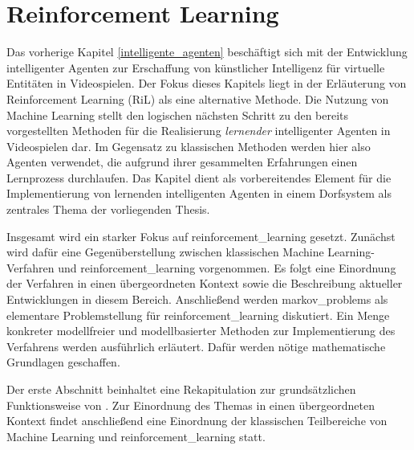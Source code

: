 \chapter{Reinforcement Learning}\label{reinforcement_learning}
Das vorherige Kapitel \ref{intelligente_agenten} beschäftigt sich mit der Entwicklung intelligenter Agenten zur Erschaffung von künstlicher Intelligenz für virtuelle Entitäten in Videospielen. Der Fokus dieses Kapitels liegt in der Erläuterung von Reinforcement Learning (RiL) als eine alternative Methode. Die Nutzung von Machine Learning stellt den logischen nächsten Schritt zu den bereits vorgestellten Methoden für die Realisierung \textit{lernender} intelligenter Agenten in Videospielen dar. Im Gegensatz zu klassischen Methoden werden hier also Agenten verwendet, die aufgrund ihrer gesammelten Erfahrungen einen Lernprozess durchlaufen. Das Kapitel dient als vorbereitendes Element für die Implementierung von lernenden intelligenten Agenten in einem Dorfsystem als zentrales Thema der vorliegenden Thesis.

Insgesamt wird ein starker Fokus auf \ac{reinforcement_learning} gesetzt. Zunächst wird dafür eine Gegenüberstellung zwischen klassischen Machine Learning-Verfahren und \ac{reinforcement_learning} vorgenommen. Es folgt eine Einordnung der Verfahren in einen übergeordneten Kontext sowie die Beschreibung aktueller Entwicklungen in diesem Bereich. Anschließend werden \acp{markov_problem} als elementare Problemstellung für \ac{reinforcement_learning} diskutiert. Ein Menge konkreter modellfreier und modellbasierter Methoden zur Implementierung des Verfahrens werden ausführlich erläutert. Dafür werden nötige mathematische Grundlagen geschaffen.

Der erste Abschnitt beinhaltet eine Rekapitulation zur grundsätzlichen Funktionsweise von . Zur Einordnung des Themas in einen übergeordneten Kontext findet anschließend eine Einordnung der klassischen Teilbereiche von Machine Learning und \ac{reinforcement_learning} statt. 





